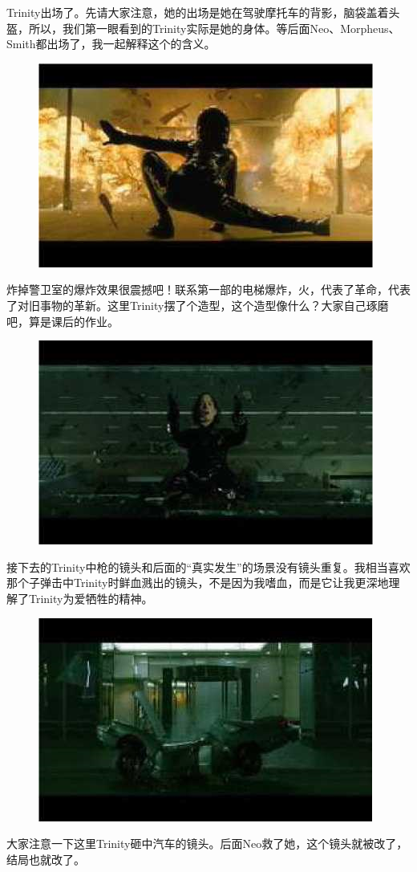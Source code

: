 \documentclass{ctexart}
\begin{document}
Trinity出场了。先请大家注意，她的出场是她在驾驶摩托车的背影，脑袋盖着头盔，所以，我们第一眼看到的Trinity实际是她的身体。等后面Neo、Morpheus、Smith都出场了，我一起解释这个的含义。

\begin{figure}[htb]
\centering
\includegraphics[width=0.5\linewidth]{fig/read_reloaded-7}
\end{figure}

炸掉警卫室的爆炸效果很震撼吧！联系第一部的电梯爆炸，火，代表了革命，代表了对旧事物的革新。这里Trinity摆了个造型，这个造型像什么？大家自己琢磨吧，算是课后的作业。

\begin{figure}[htb]
\centering
\includegraphics[width=0.5\linewidth]{fig/read_reloaded-9}
\end{figure}

接下去的Trinity中枪的镜头和后面的“真实发生”的场景没有镜头重复。我相当喜欢那个子弹击中Trinity时鲜血溅出的镜头，不是因为我嗜血，而是它让我更深地理解了Trinity为爱牺牲的精神。

\begin{figure}[!htb]
\centering
\includegraphics[width=0.5\linewidth]{fig/read_reloaded-10}
\end{figure}

大家注意一下这里Trinity砸中汽车的镜头。后面Neo救了她，这个镜头就被改了，结局也就改了。
\end{document}
